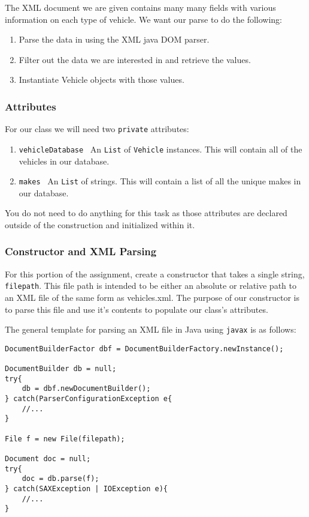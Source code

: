 The XML document we are given contains many many fields with various
information on each type of vehicle. We want our parse to do the following:
\begin{enumerate}
  \item Parse the data in using the XML java DOM parser.
  \item Filter out the data we are interested in and retrieve the values.
  \item Instantiate Vehicle objects with those values.
\end{enumerate}


\subsubsection{Attributes}

For our class we will need two \lstinline|private| attributes:
\begin{enumerate}
    \item \lstinline|vehicleDatabase|  \textrightarrow \  An \lstinline|List| of \lstinline|Vehicle| instances. This will contain all of the vehicles in our database.
    \item \lstinline|makes| \textrightarrow \ An \lstinline|List| of strings. This will contain a list of all the unique makes in our database.
\end{enumerate}
You do not need to do anything for this task as those attributes are declared outside of the construction
and initialized within it.

\subsubsection{Constructor and XML Parsing}

For this portion of the assignment, create a constructor that takes a single
string, \lstinline|filepath|. This file path is intended to be either an
absolute or relative path to an XML file of the same form as vehicles.xml. The
purpose of our constructor is to parse this file and use it's contents to
populate our class's attributes.

The general template for parsing an XML file in Java using \lstinline|javax| is as 
follows:
\begin{lstlisting}[frame=trBL]
DocumentBuilderFactor dbf = DocumentBuilderFactory.newInstance();

DocumentBuilder db = null;
try{
    db = dbf.newDocumentBuilder();
} catch(ParserConfigurationException e{
    //...
}

File f = new File(filepath);

Document doc = null;
try{
    doc = db.parse(f);
} catch(SAXException | IOException e){
    //...
}
\end{lstlisting}

